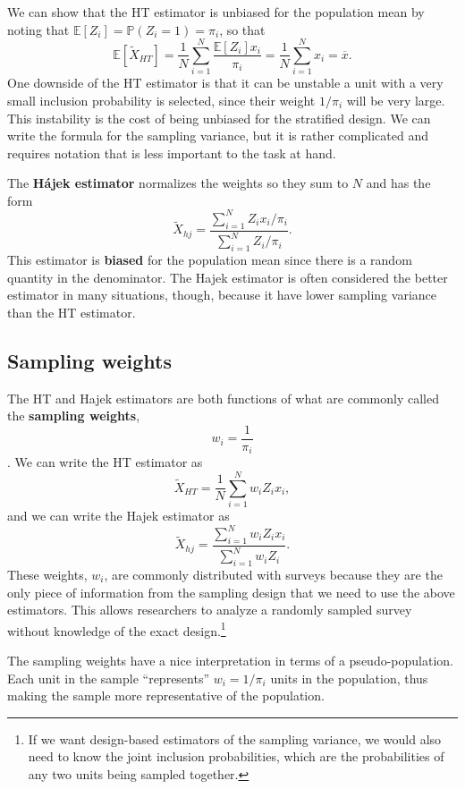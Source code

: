 \documentclass[
  letterpaper,
  DIV=11,
  numbers=noendperiod]{scrreprt}
\newcommand{\E}{\mathbb{E}}
\renewcommand{\P}{\mathbb{P}}
\theoremstyle{definition}
\theoremstyle{definition}
\theoremstyle{plain}
\theoremstyle{remark}
\begin{document}
We can show that the HT estimator is unbiased for the population mean by
noting that \(\E[Z_i] = \P(Z_i = 1) = \pi_i\), so that \[
\E[\widetilde{X}_{HT}] = \frac{1}{N} \sum_{i=1}^N \frac{\E[Z_i]x_i}{\pi_i} = \frac{1}{N} \sum_{i=1}^N x_i = \overline{x}. 
\] One downside of the HT estimator is that it can be unstable a unit
with a very small inclusion probability is selected, since their weight
\(1/\pi_i\) will be very large. This instability is the cost of being
unbiased for the stratified design. We can write the formula for the
sampling variance, but it is rather complicated and requires notation
that is less important to the task at hand.

The \textbf{Hájek estimator} normalizes the weights so they sum to \(N\)
and has the form \[ 
\widetilde{X}_{hj} = \frac{\sum_{i=1}^N Z_{i}x_{i} / \pi_{i}}{\sum_{i=1}^{N} Z_{i}/\pi_{i}}.
\] This estimator is \textbf{biased} for the population mean since there
is a random quantity in the denominator. The Hajek estimator is often
considered the better estimator in many situations, though, because it
have lower sampling variance than the HT estimator.

\hypertarget{sampling-weights}{%
\subsection{Sampling weights}\label{sampling-weights}}

The HT and Hajek estimators are both functions of what are commonly
called the \textbf{sampling weights}, \[w_i = \frac{1}{\pi_i}\]. We can
write the HT estimator as \[
\widetilde{X}_{HT} = \frac{1}{N} \sum_{i=1}^N w_iZ_ix_i,
\] and we can write the Hajek estimator as \[
\widetilde{X}_{hj} = \frac{\sum_{i=1}^N w_iZ_{i}x_{i}}{\sum_{i=1}^{N} w_iZ_{i}}.
\] These weights, \(w_i\), are commonly distributed with surveys because
they are the only piece of information from the sampling design that we
need to use the above estimators. This allows researchers to analyze a
randomly sampled survey without knowledge of the exact
design.\footnote{If we want design-based estimators of the sampling
  variance, we would also need to know the joint inclusion
  probabilities, which are the probabilities of any two units being
  sampled together.}

The sampling weights have a nice interpretation in terms of a
pseudo-population. Each unit in the sample ``represents''
\(w_i = 1/\pi_i\) units in the population, thus making the sample more
representative of the population.
\end{document}
